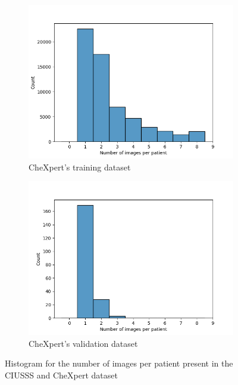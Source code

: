 \documentclass[11pt]{article}
\begin{document}
\begin{figure}[H]
     \begin{subfigure}[b]{0.45\linewidth}
         \centering
         \includegraphics[width=\linewidth]{plots/image_count_chexpert_train}
         \caption{CheXpert's training dataset}
         \vspace{4ex}
         \label{fig:count_image_chexpert_train}
     \end{subfigure}
     \hfill
     \begin{subfigure}[b]{0.45\linewidth}
         \centering
         \includegraphics[width=\linewidth]{plots/image_count_chexpert_valid}
         \caption{CheXpert's validation dataset}
         \vspace{4ex}
         \label{fig:count_image_chexpert_valid}
     \end{subfigure}
     \label{fig:images_per_patient}
     \caption{Histogram for the number of images per patient present in the CIUSSS and CheXpert dataset}

\end{figure}
\end{document}

